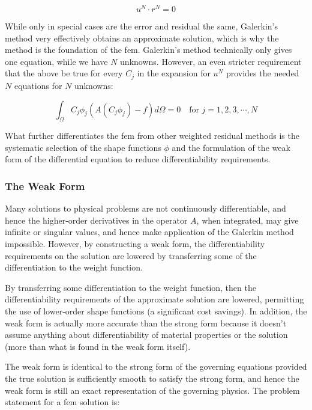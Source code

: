 \documentclass[10pt]{article}
\numberwithin{equation}{section} %
\begin{document}
\begin{equation}
u^N\cdot r^N=0
\end{equation}

While only in special cases are the error and residual the same, Galerkin's method very effectively obtains an approximate solution, which is why the method is the foundation of the \gls{fem}. Galerkin's method technically only gives one equation, while we have \(N\) unknowns. However, an even stricter requirement that the above be true for every \(C_j\) in the expansion for \(u^N\) provides the needed \(N\) equations for \(N\) unknowns:

\begin{equation} 
\int_{\Omega}C_j\phi_j\left(A(C_j\phi_j)-f\right)d\Omega=0\quad\text{for } j=1, 2, 3, \cdots, N
\end{equation}

What further differentiates the \gls{fem} from other weighted residual methods is the systematic selection of the shape functions \(\phi\) and the formulation of the weak form of the differential equation to reduce differentiability requirements.

\subsubsection{The Weak Form}

Many solutions to physical problems are not continuously differentiable, and hence the higher-order derivatives in the operator \(A\), when integrated, may give infinite or singular values, and hence make application of the Galerkin method impossible. However, by constructing a weak form, the differentiability requirements on the solution are lowered by transferring some of the differentiation to the weight function.

By transferring some differentiation to the weight function, then the differentiability requirements of the approximate solution are lowered, permitting the use of lower-order shape functions (a significant cost savings). In addition, the weak form is actually more accurate than the strong form because it doesn't assume anything about differentiability of material properties or the solution (more than what is found in the weak form itself). 

The weak form is identical to the strong form of the governing equations provided the true solution is sufficiently smooth to satisfy the strong form, and hence the weak form is still an exact representation of the governing physics. The problem statement for a \gls{fem} solution is:
\end{document}
